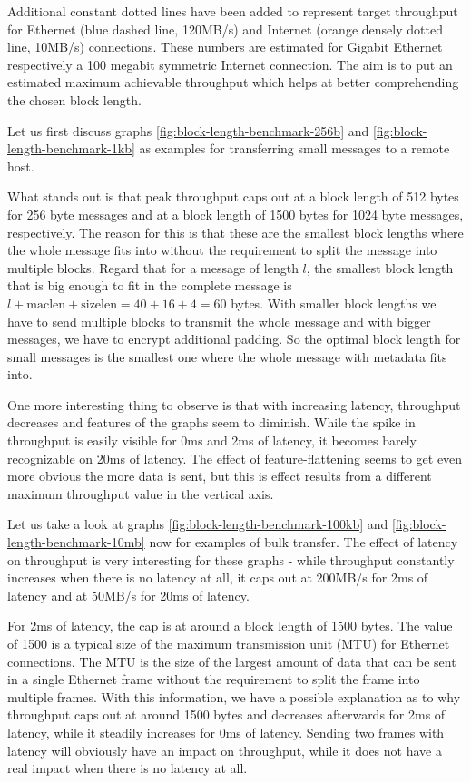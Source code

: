 Additional constant dotted lines have been added to represent target throughput for Ethernet (blue dashed line, 120MB/s) and Internet (orange densely dotted line, 10MB/s) connections.
These numbers are estimated for Gigabit Ethernet respectively a 100 megabit symmetric Internet connection.
The aim is to put an estimated maximum achievable throughput which helps at better comprehending the chosen block length.

\medskip

Let us first discuss graphs \ref{fig:block-length-benchmark-256b} and \ref{fig:block-length-benchmark-1kb} as examples for transferring small messages to a remote host.

What stands out is that peak throughput caps out at a block length of 512 bytes for 256 byte messages and at a block length of 1500 bytes for 1024 byte messages, respectively.
The reason for this is that these are the smallest block lengths where the whole message fits into without the requirement to split the message into multiple blocks.
Regard that for a message of length $l$, the smallest block length that is big enough to fit in the complete message is $l + \text{maclen} + \text{sizelen} = 40 + 16 + 4 = 60$ bytes.
With smaller block lengths we have to send multiple blocks to transmit the whole message and with bigger messages, we have to encrypt additional padding.
So the optimal block length for small messages is the smallest one where the whole message with metadata fits into.

One more interesting thing to observe is that with increasing latency, throughput decreases and features of the graphs seem to diminish.
While the spike in throughput is easily visible for 0ms and 2ms of latency, it becomes barely recognizable on 20ms of latency.
The effect of feature-flattening seems to get even more obvious the more data is sent, but this is effect results from a different maximum throughput value in the vertical axis.

Let us take a look at graphs \ref{fig:block-length-benchmark-100kb} and \ref{fig:block-length-benchmark-10mb} now for examples of bulk transfer.
The effect of latency on throughput is very interesting for these graphs - while throughput constantly increases when there is no latency at all, it caps out at 200MB/s for 2ms of latency and at 50MB/s for 20ms of latency.

For 2ms of latency, the cap is at around a block length of 1500 bytes.
The value of 1500 is a typical size of the maximum transmission unit (MTU) for Ethernet connections.
The MTU is the size of the largest amount of data that can be sent in a single Ethernet frame without the requirement to split the frame into multiple frames.
With this information, we have a possible explanation as to why throughput caps out at around 1500 bytes and decreases afterwards for 2ms of latency, while it steadily increases for 0ms of latency.
Sending two frames with latency will obviously have an impact on throughput, while it does not have a real impact when there is no latency at all.

